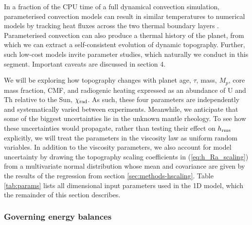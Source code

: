 \documentclass[trackchanges]{aastex63}
\begin{document}
In a fraction of the CPU time of a full dynamical convection simulation, parameterised convection models can result in similar temperatures to numerical models by tracking heat fluxes across the two thermal boundary layers \citep{thiriet_scaling_2019}. Parameterised convection can also produce a thermal history of the planet, from which we can extract a self-consistent evolution of dynamic topography. Further, such low-cost models invite parameter studies, which naturally we conduct in this segment. Important caveats are discussed in section 4.

We will be exploring how topography changes with planet age, $\tau$, mass, $M_p$, core mass fraction, CMF, and radiogenic heating expressed as an abundance of U and Th relative to the Sun, $\chi_{\rm rad}$. As such, these four parameters are independently and systematically varied between experiments. Meanwhile, we anticipate that some of the biggest uncertainties lie in the unknown mantle rheology. To see how these uncertainties would propagate, rather than testing their effect on $h_{\rm rms}$ explicitly, we will treat the parameters in the viscosity law as uniform random variables. In addition to the viscosity parameters, we also account for model uncertainty by drawing the topography scaling coefficients in (\ref{eq:h_Ra_scaling}) from a multivariate normal distribution whose mean and covariance are given by the results of the regression from section \ref{sec:methods-hscaling}. Table \ref{tab:params} lists all dimensional input parameters used in the 1D model, which the remainder of this section describes.

\subsubsection{Governing energy balances}
\end{document}
